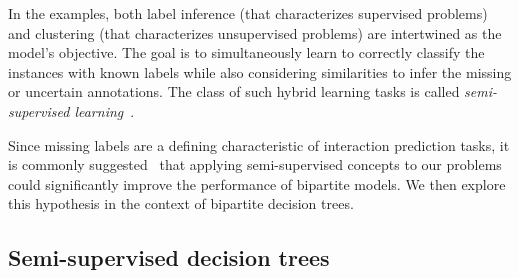 In the examples, both label inference (that characterizes supervised problems) and clustering (that characterizes unsupervised problems) are intertwined as the model's objective. The goal is to simultaneously learn to correctly classify the instances with known labels while also considering similarities to infer the missing or uncertain annotations. The class of such hybrid learning tasks is called \emph{semi-supervised learning}~\cite{chapelle2006semisupervised,zhu2022introduction}.

Since missing labels are a defining characteristic of interaction prediction tasks, it is commonly suggested~\cite{he2017simboost,liu2016neighborhood,alves2023semisupervised}  %
that applying semi-supervised concepts to our problems could significantly improve the performance of bipartite models.
%
We then explore this hypothesis in the context of bipartite decision trees.



\subsection{Semi-supervised decision trees}
\label{sec:ss trees 2}

